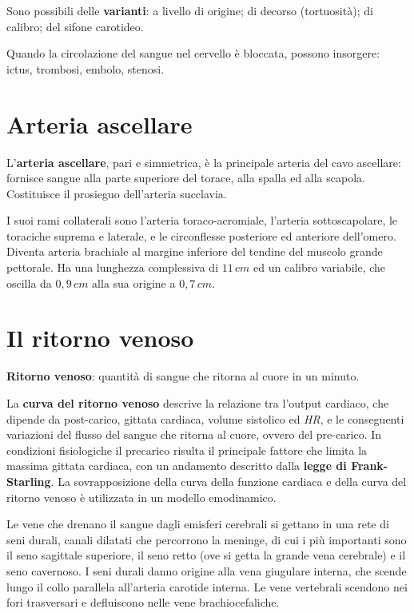 Sono possibili delle \textbf{varianti}: a livello di origine; di decorso (tortuosità); di calibro;
del sifone carotideo.

Quando la circolazione del sangue nel cervello è bloccata, possono insorgere: ictus, trombosi,
embolo, stenosi.

\section{Arteria ascellare}

L'\textbf{arteria ascellare}, pari e simmetrica, è la principale arteria del cavo ascellare:
fornisce sangue alla parte superiore del torace, alla spalla ed alla scapola. Costituisce il
prosieguo dell'arteria succlavia.

I suoi rami collaterali sono l'arteria toraco-acromiale, l'arteria sottoscapolare, le toraciche
suprema e laterale, e le circonflesse posteriore ed anteriore dell'omero. Diventa arteria
brachiale al margine inferiore del tendine del muscolo grande pettorale. Ha una lunghezza
complessiva di $11\,cm$ ed un calibro variabile, che oscilla da $0,9\,cm$ alla sua origine a
$0,7\,cm$.

\section{Il ritorno venoso}

\textbf{Ritorno venoso}: quantità di sangue che ritorna al cuore in un minuto.

La \textbf{curva del ritorno venoso} descrive la relazione tra l'output cardiaco, che dipende da
post-carico, gittata cardiaca, volume sistolico ed \textit{HR}, e le conseguenti variazioni del
flusso del sangue che ritorna al cuore, ovvero del pre-carico. In condizioni fisiologiche il
precarico risulta il principale fattore che limita la massima gittata cardiaca, con un andamento
descritto dalla \textbf{legge di Frank-Starling}. La sovrapposizione della curva della funzione
cardiaca e della curva del ritorno venoso è utilizzata in un modello emodinamico.

Le vene che drenano il sangue dagli emisferi cerebrali si gettano in una rete di seni durali,
canali dilatati che percorrono la meninge, di cui i più importanti sono il seno sagittale
superiore, il seno retto (ove si getta la grande vena cerebrale) e il seno cavernoso. I seni
durali danno origine alla vena giugulare interna, che scende lungo il collo parallela all'arteria
carotide interna. Le vene vertebrali scendono nei fori trasversari e defluiscono nelle vene
brachiocefaliche.

